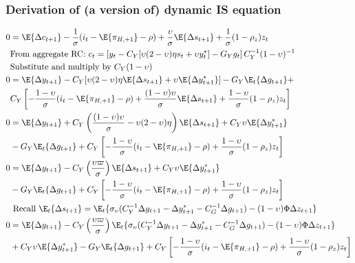 \subsubsection*{Derivation of (a version of) dynamic IS equation}
\begin{align}\label{eq:dynamic_is_beginning}
    0 &= \E \{ \Delta c_{t+1}\} - \frac{1}{\sigma}(i_t - \E \{ \pi_{H,+1}\} - \rho) + \frac{\upsilon}{\sigma}\E \{ \Delta s_{t+1} \} + \frac{1}{\sigma}(1-\rho_z)z_t \\
    &\text{From aggregate RC: $c_t = \left[ y_t - C_Y[\upsilon(2-\upsilon)\eta s_t + \upsilon y_t^*] - G_Y g_t\right] C_Y^{-1}(1-\upsilon)^{-1}$} \nonumber\\
    &\text{Substitute and multiply by $C_Y(1-\upsilon)$}\nonumber\\
    0  &= \E \{ \Delta y_{t+1}\}  - C_Y[\upsilon(2-\upsilon)\eta \E \{\Delta s_{t+1} \} + \upsilon \E \{\Delta y_{t+1}^* \}] -G_Y \E_t\{\Delta g_{t+1}\} + \nonumber\\ 
    &C_Y\left[- \frac{1-\upsilon}{\sigma}(i_t - \E \{ \pi_{H,+1}\} - \rho) + \frac{(1-\upsilon)\upsilon}{\sigma}\E \{ \Delta s_{t+1} \} + \frac{1-\upsilon}{\sigma}(1-\rho_z)z_t \right] \\
    0  &= \E \{ \Delta y_{t+1}\}  + C_Y\left(\frac{(1-\upsilon)\upsilon}{\sigma} - \upsilon(2-\upsilon)\eta\right) \E \{\Delta s_{t+1} \} + C_Y \upsilon \E \{\Delta y_{t+1}^* \} \nonumber\\ 
    &-G_Y \E_t\{\Delta g_{t+1}\} + C_Y\left[- \frac{1-\upsilon}{\sigma}(i_t - \E \{ \pi_{H,+1}\} - \rho)  + \frac{1-\upsilon}{\sigma}(1-\rho_z)z_t \right] \\
    0  &= \E \{ \Delta y_{t+1}\}  - C_Y\left(\frac{\upsilon \varpi}{\sigma}\right) \E \{\Delta s_{t+1} \} + C_Y \upsilon \E \{\Delta y_{t+1}^* \} \nonumber\\
     &-G_Y \E_t\{\Delta g_{t+1}\} + C_Y\left[- \frac{1-\upsilon}{\sigma}(i_t - \E \{ \pi_{H,+1}\} - \rho)  + \frac{1-\upsilon}{\sigma}(1-\rho_z)z_t \right] \\
     &\text{ Recall $\E_t \{ \Delta s_{t+1}\} = \E_t\{\sigma_\upsilon(C_Y^{-1} \Delta y_{t+1} - \Delta y^*_{t+1} - C_G^{-1} \Delta g_{t+1}) - (1-\upsilon)\Phi \Delta z_{t+1}\}$}\nonumber\\
    0 &= \E \{ \Delta y_{t+1}\}  - C_Y\left(\frac{\upsilon \varpi}{\sigma}\right) \E_t\{\sigma_\upsilon(C_Y^{-1} \Delta y_{t+1} - \Delta y^*_{t+1} - C_G^{-1} \Delta g_{t+1}) - (1-\upsilon)\Phi \Delta z_{t+1}\} \nonumber \\ 
    &+ C_Y \upsilon \E \{\Delta y_{t+1}^* \} -G_Y \E_t\{\Delta g_{t+1}\} + C_Y\left[- \frac{1-\upsilon}{\sigma}(i_t - \E \{ \pi_{H,+1}\} - \rho)  + \frac{1-\upsilon}{\sigma}(1-\rho_z)z_t \right] \\

\end{align}
